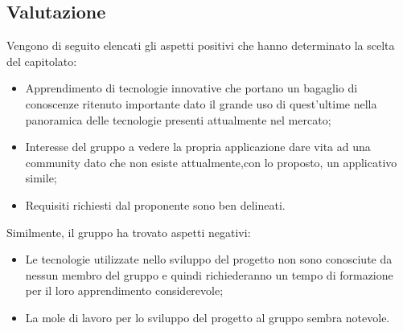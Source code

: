 \subsection{Valutazione}
        Vengono di seguito elencati gli aspetti positivi che hanno determinato la scelta del capitolato:
        \begin{itemize}
        \item Apprendimento di tecnologie innovative che portano un bagaglio di conoscenze ritenuto importante dato il grande uso di quest'ultime nella panoramica delle tecnologie presenti attualmente nel mercato;
        \item Interesse del gruppo a vedere la propria applicazione dare vita ad una community dato che non esiste attualmente,con 		lo   proposto, un applicativo simile;
        \item Requisiti richiesti dal proponente sono ben delineati.
        \end{itemize}
		Similmente, il gruppo ha trovato aspetti negativi:
        \begin{itemize}
        \item Le tecnologie utilizzate nello sviluppo del progetto non sono conosciute da nessun membro del gruppo \GroupName e
        quindi richiederanno un tempo di formazione per il loro apprendimento considerevole;
        \item La mole di lavoro per lo sviluppo del progetto al gruppo sembra notevole.
        \end{itemize}
        
